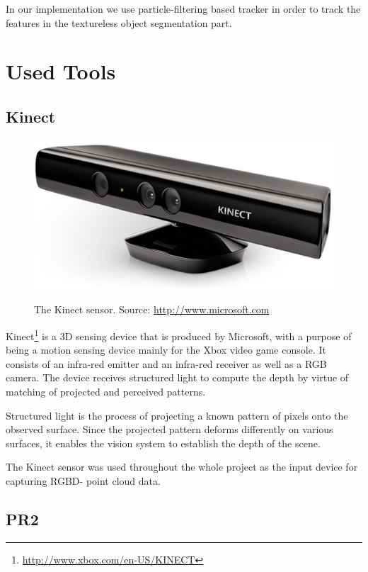 In our implementation we use particle-filtering based tracker in order to track the features in the textureless object segmentation part.      



\section{Used Tools}
\subsection{Kinect}

\begin{figure}
\centering

{\includegraphics[width=0.5\columnwidth]{figures/kinect.jpg}}

\caption{The Kinect sensor. Source: \url{http://www.microsoft.com}}
\label{fig:kinect}
\end{figure}

Kinect\footnote{\url{http://www.xbox.com/en-US/KINECT}} is a 3D sensing device that is produced by Microsoft, with a purpose of being a motion sensing device mainly for the Xbox video game console. It consists of an infra-red emitter and an infra-red receiver as well as a RGB camera. The device receives structured light to compute the depth by virtue of matching of projected and perceived patterns.

Structured light is the process of projecting a known pattern of pixels onto the observed surface. Since the projected pattern deforms differently on various surfaces, it enables  the vision system to establish the depth of the scene.

The Kinect sensor was used throughout the whole project as the input device for capturing RGBD- point cloud  data.

\subsection{PR2}

